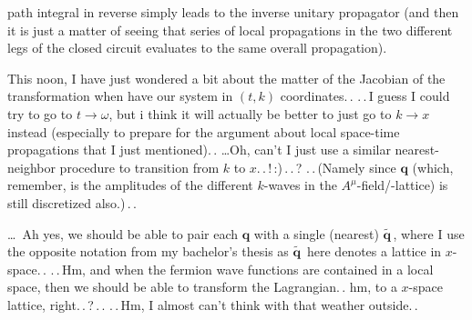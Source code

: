 \documentclass{report}
\begin{document}
path integral in reverse simply leads to the inverse unitary propagator (and then it is just a matter of seeing that series of local propagations in the two different legs of the closed circuit evaluates to the same overall propagation). 

This noon, I have just wondered a bit about the matter of the Jacobian of the transformation when have our system in $(t, k)$ coordinates.\,. .\,.\,I guess I could try to go to $t\to \omega$, but i think it will actually be better to just go to $k\to x$ instead (especially to prepare for the argument about local space-time propagations that I just mentioned).\,. 
\ldots Oh, can't I just use a similar nearest-neighbor procedure to transition from $k$ to $x$.\,.\,!\,:)\,.\,.\,? %
.\,.\,(Namely since $\boldsymbol{q}$ (which, remember, is the amplitudes of the different $k$-waves in the $A^\mu$-field/-lattice) is still discretized also.)\,.\,. 

\ldots\ Ah yes, we should be able to pair each $\boldsymbol{q}$ with a single (nearest) $\tilde{\boldsymbol{q\,}}\!$, where I use the opposite notation from my bachelor's thesis as $\tilde{\boldsymbol{q\,}}\!$ here denotes a lattice in $x$-space.\,. .\,.\,Hm, and when the fermion wave functions are contained in a local space, then we should be able to transform the Lagrangian.\,. hm, to a $x$-space lattice, right.\,.\,?\,.\,. .\,.\,Hm, I almost can't think with that weather outside.\,. %
\end{document}
